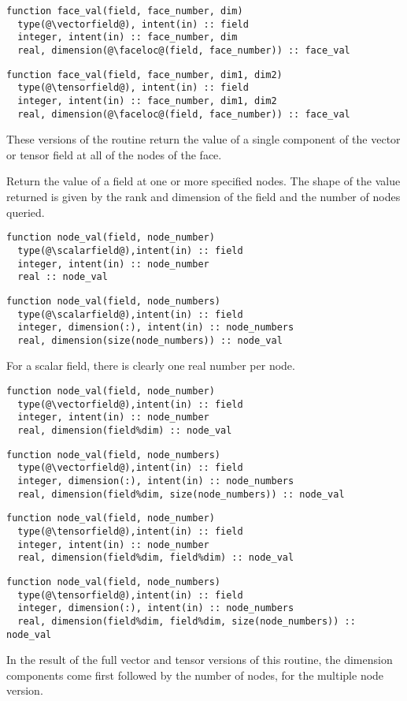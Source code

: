 \documentclass[a4paper, 11pt]{book}
\begin{document}
\begin{lstlisting}
function face_val(field, face_number, dim) 
  type(@\vectorfield@), intent(in) :: field
  integer, intent(in) :: face_number, dim
  real, dimension(@\faceloc@(field, face_number)) :: face_val
\end{lstlisting}
\begin{lstlisting}
function face_val(field, face_number, dim1, dim2) 
  type(@\tensorfield@), intent(in) :: field
  integer, intent(in) :: face_number, dim1, dim2
  real, dimension(@\faceloc@(field, face_number)) :: face_val
\end{lstlisting}
These versions of the routine return the value of a single component of the
vector or tensor field at all of the nodes of the face. 


Return the value of a field at one or more specified nodes. The shape of the
value returned is given by the rank and dimension of the field and the
number of nodes queried.

\begin{lstlisting}
function node_val(field, node_number)
  type(@\scalarfield@),intent(in) :: field
  integer, intent(in) :: node_number
  real :: node_val
\end{lstlisting}
\begin{lstlisting}
function node_val(field, node_numbers)
  type(@\scalarfield@),intent(in) :: field
  integer, dimension(:), intent(in) :: node_numbers
  real, dimension(size(node_numbers)) :: node_val
\end{lstlisting}

For a scalar field, there is clearly one real number per node.

\begin{lstlisting}
function node_val(field, node_number)
  type(@\vectorfield@),intent(in) :: field
  integer, intent(in) :: node_number
  real, dimension(field%dim) :: node_val
\end{lstlisting}
\begin{lstlisting}
function node_val(field, node_numbers)
  type(@\vectorfield@),intent(in) :: field
  integer, dimension(:), intent(in) :: node_numbers
  real, dimension(field%dim, size(node_numbers)) :: node_val
\end{lstlisting}
\begin{lstlisting}
function node_val(field, node_number)
  type(@\tensorfield@),intent(in) :: field
  integer, intent(in) :: node_number
  real, dimension(field%dim, field%dim) :: node_val
\end{lstlisting}
\begin{lstlisting}
function node_val(field, node_numbers)
  type(@\tensorfield@),intent(in) :: field
  integer, dimension(:), intent(in) :: node_numbers
  real, dimension(field%dim, field%dim, size(node_numbers)) :: node_val
\end{lstlisting}
In the result of the full vector and tensor versions of this routine, the
dimension components come first followed by the number of nodes, for the
multiple node version.
\end{document}
